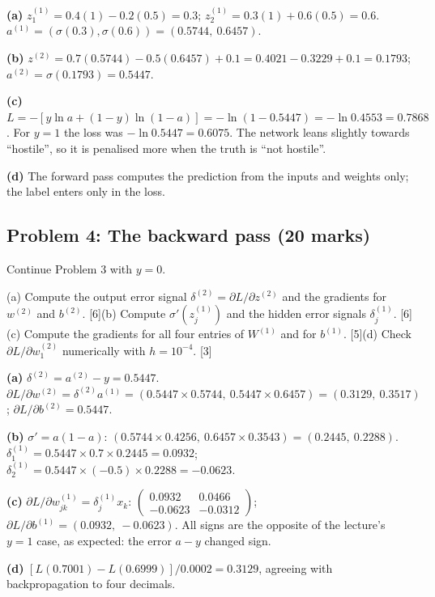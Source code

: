 \documentclass[11pt]{article}
\begin{document}
\begin{soln}\textbf{(a)} $z^{(1)}_1=0.4(1)-0.2(0.5)=0.3$; $z^{(1)}_2=0.3(1)+0.6(0.5)=0.6$. $a^{(1)}=(\sigma(0.3),\sigma(0.6))=(\mathbf{0.5744},\ \mathbf{0.6457})$.

\textbf{(b)} $z^{(2)}=0.7(0.5744)-0.5(0.6457)+0.1=0.4021-0.3229+0.1=\mathbf{0.1793}$; $a^{(2)}=\sigma(0.1793)=\mathbf{0.5447}$.

\textbf{(c)} $L=-[y\ln a+(1-y)\ln(1-a)]=-\ln(1-0.5447)=-\ln0.4553=\mathbf{0.7868}$. For $y=1$ the loss was $-\ln0.5447=0.6075$. The network leans slightly towards ``hostile'', so it is penalised more when the truth is ``not hostile''.

\textbf{(d)} The forward pass computes the prediction from the inputs and weights only; the label enters only in the loss.\end{soln}

\subsection{Problem 4: The backward pass \normalfont\small\color{GreyN}(20 marks)}

\begin{prob}Continue Problem 3 with $y=0$.

(a) Compute the output error signal $\delta^{(2)}=\partial L/\partial z^{(2)}$ and the gradients for $w^{(2)}$ and $b^{(2)}$. [6]\newline (b) Compute $\sigma'(z^{(1)}_j)$ and the hidden error signals $\delta^{(1)}_j$. [6]\newline (c) Compute the gradients for all four entries of $W^{(1)}$ and for $b^{(1)}$. [5]\newline (d) Check $\partial L/\partial w^{(2)}_1$ numerically with $h=10^{-4}$. [3]\end{prob}

\begin{soln}\textbf{(a)} $\delta^{(2)}=a^{(2)}-y=\mathbf{0.5447}$. $\partial L/\partial w^{(2)}=\delta^{(2)}a^{(1)}=(0.5447\times0.5744,\ 0.5447\times0.6457)=(\mathbf{0.3129},\ \mathbf{0.3517})$; $\partial L/\partial b^{(2)}=\mathbf{0.5447}$.

\textbf{(b)} $\sigma'=a(1-a)$: $(0.5744\times0.4256,\ 0.6457\times0.3543)=(0.2445,\ 0.2288)$. $\delta^{(1)}_1=0.5447\times0.7\times0.2445=\mathbf{0.0932}$; $\delta^{(1)}_2=0.5447\times(-0.5)\times0.2288=\mathbf{-0.0623}$.

\textbf{(c)} $\partial L/\partial w^{(1)}_{jk}=\delta^{(1)}_jx_k$: $\begin{pmatrix}0.0932&0.0466\\-0.0623&-0.0312\end{pmatrix}$; $\partial L/\partial b^{(1)}=(0.0932,\ -0.0623)$. All signs are the opposite of the lecture's $y=1$ case, as expected: the error $a-y$ changed sign.

\textbf{(d)} $[L(0.7001)-L(0.6999)]/0.0002=0.3129$, agreeing with backpropagation to four decimals.\end{soln}
\end{document}
